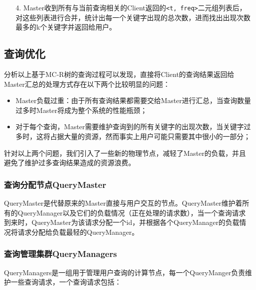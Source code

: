 \documentclass{elegantpaper}
\begin{document}
\begin{itemize}
\begin{algorithm}
\begin{algorithmic}[1]
                \end{algorithmic}
                  
              \end{algorithm}
    
    \item[4.] Master收到所有与当前查询相关的Client返回的\verb|<t, freq>|二元组列表后，对这些列表进行合并，统计出每一个关键字出现的总次数，进而找出出现次数最多的k个关键字并返回给用户。

\end{itemize}

\subsection{查询优化}

分析以上基于MC-R树的查询过程可以发现，直接将Client的查询结果返回给Master汇总的处理方式存在以下两个比较明显的问题：

\begin{itemize}

    \item Master负载过重：由于所有查询结果都需要交给Master进行汇总，当查询数量过多时Master将成为整个系统的性能瓶颈；
    
    \item 对于每个查询，Master需要维护查询到的所有关键字的出现次数，当关键字过多时，这将占据大量的资源，然而事实上用户可能只需要其中很小的一部分；
    
\end{itemize}

\noindent 针对以上两个问题，我们引入了一些新的物理节点，减轻了Master的负载，并且避免了维护过多查询结果造成的资源浪费。

\subsubsection{查询分配节点QueryMaster}

QueryMaster是代替原来的Master直接与用户交互的节点。QueryMaster维护着所有的QueryManager以及它们的负载情况（正在处理的请求数），当一个查询请求到来时，QueryMaster为该请求分配一个id，并根据各个QueryManager的负载情况将请求分配给负载最轻的QueryManager。

\subsubsection{查询管理集群QueryManagers}

QueryManagers是一组用于管理用户查询的计算节点，每一个QueryManger负责维护一些查询请求，一个查询请求包括：
\end{document}
